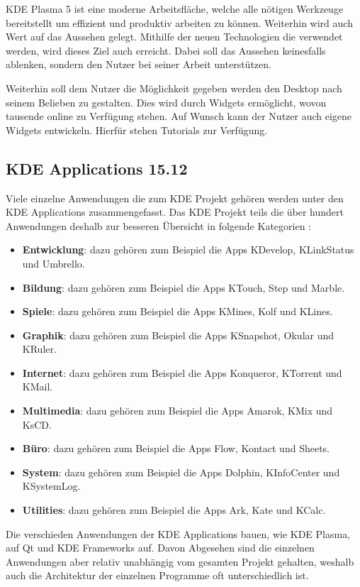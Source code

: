 \documentclass[10pt,a4paper,twocolumn]{article}
\begin{document}
KDE Plasma 5 ist eine moderne Arbeitsfläche, welche alle nötigen Werkzeuge bereitstellt um effizient und produktiv arbeiten zu können. Weiterhin wird auch Wert auf das Aussehen gelegt. Mithilfe der neuen Technologien die verwendet werden, wird dieses Ziel auch erreicht. Dabei soll das Aussehen keinesfalls ablenken, sondern den Nutzer bei seiner Arbeit unterstützen. \cite{KDEPlasma}

Weiterhin soll dem Nutzer die Möglichkeit gegeben werden den Desktop nach seinem Belieben zu gestalten. Dies wird durch Widgets ermöglicht, wovon tausende online zu Verfügung stehen. Auf Wunsch kann der Nutzer auch eigene Widgets entwickeln. Hierfür stehen Tutorials zur Verfügung.


\subsection{KDE Applications 15.12}
Viele einzelne Anwendungen die zum KDE Projekt gehören werden unter den KDE Applications zusammengefasst. Das KDE Projekt teils die über hundert Anwendungen deshalb zur besseren Übersicht in folgende Kategorien \cite{KDEApps}:

\begin{itemize}
	\item \textbf{Entwicklung}: dazu gehören zum Beispiel die Apps KDevelop, KLinkStatus und Umbrello.
	\item \textbf{Bildung}: dazu gehören zum Beispiel die Apps KTouch, Step und Marble.
	\item \textbf{Spiele}: dazu gehören zum Beispiel die Apps KMines, Kolf und KLines.
	\item \textbf{Graphik}: dazu gehören zum Beispiel die Apps KSnapshot, Okular und KRuler.
	\item \textbf{Internet}: dazu gehören zum Beispiel die Apps Konqueror, KTorrent und KMail.
	\item \textbf{Multimedia}: dazu gehören zum Beispiel die Apps Amarok, KMix und KsCD.
	\item \textbf{Büro}: dazu gehören zum Beispiel die Apps Flow, Kontact und Sheets.
	\item \textbf{System}: dazu gehören zum Beispiel die Apps Dolphin, KInfoCenter und KSystemLog.
	\item \textbf{Utilities}: dazu gehören zum Beispiel die Apps Ark, Kate und KCalc.
\end{itemize}

Die verschieden Anwendungen der KDE Applications bauen, wie KDE Plasma, auf Qt und KDE Frameworks auf. Davon Abgesehen sind die einzelnen Anwendungen aber relativ unabhängig vom gesamten Projekt gehalten, weshalb auch die Architektur der einzelnen Programme oft unterschiedlich ist. 
\end{document}
